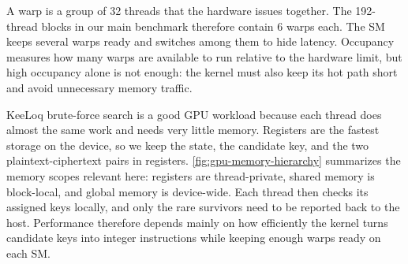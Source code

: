\documentclass[version=preprint]{iacrcc}
\begin{document}
A warp is a group of 32 threads that the hardware issues together.
The 192-thread blocks in our main benchmark therefore contain 6 warps each.
The SM keeps several warps ready and switches among them to hide latency.
Occupancy measures how many warps are available to run relative to the hardware limit, but high occupancy alone is not enough: the kernel must also keep its hot path short and avoid unnecessary memory traffic.

KeeLoq brute-force search is a good GPU workload because each thread does almost the same work and needs very little memory.
Registers are the fastest storage on the device, so we keep the state, the candidate key, and the two plaintext-ciphertext pairs in registers.
\autoref{fig:gpu-memory-hierarchy} summarizes the memory scopes relevant here: registers are thread-private, shared memory is block-local, and global memory is device-wide.
Each thread then checks its assigned keys locally, and only the rare survivors need to be reported back to the host.
Performance therefore depends mainly on how efficiently the kernel turns candidate keys into integer instructions while keeping enough warps ready on each SM.
\end{document}
